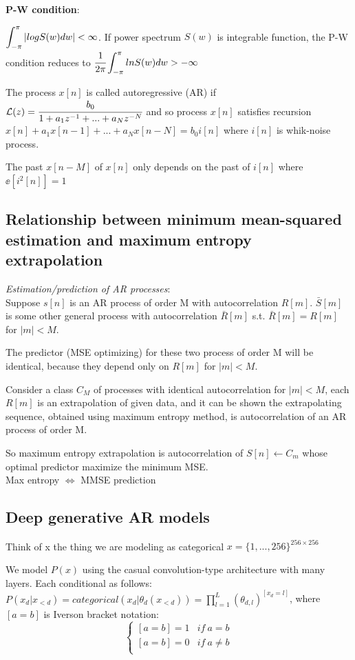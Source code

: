 \documentclass[12pt,a4paper]{article}
\begin{document}
\vspace{0.5cm}
\textbf{P-W condition}:

$\bint{-\pi}{\pi}|logS(w)dw|< \infty$. If power spectrum $S(w)$ is integrable function, the P-W condition reduces to $\cfrac{1}{2\pi}\bint{-\pi}{\pi} lnS(w)dw>-\infty$

The process $x[n]$ is called autoregressive (AR) if $\mathcal{L}(z)=\cfrac{b_0}{1+a_1z^{-1}+...+a_Nz^{-N}}$ and so process $x[n]$ satisfies recursion 
$x[n]+a_1x[n-1]+...+a_Nx[n-N]=b_0i[n]$ where $i[n]$ is whik-noise process. 

The past $x[n-M]$ of $x[n]$ only depends on the past of $i[n]$ where $\ee[i^2[n]]=1$

\subsection{Relationship between minimum mean-squared estimation and maximum entropy extrapolation}
\textit{Estimation/prediction of AR processes}: \\
Suppose $s[n]$ is an AR process of order M with autocorrelation $R[m]$. $\bar{S}[m]$ is some other general process with autocorrelation $\bar{R}[m]$ s.t. $\bar{R}[m]=R[m]$ for $|m|<M$. 

The predictor (MSE optimizing) for these two process of order M will be identical, because they depend only on $R[m]$ for $|m|<M$.

Consider a class $C_M$ of processes with identical autocorrelation for $|m|<M$, each $R[m]$ is an extrapolation of given data, and it can be shown the extrapolating sequence, obtained using maximum entropy method, is autocorrelation of an AR process of order M. 

So maximum entropy extrapolation is autocorrelation of $S[n]\leftarrow C_m$ whose optimal predictor maximize the minimum MSE. \\
Max entropy $\Leftrightarrow$ MMSE prediction

\subsection{Deep generative AR models}

Think of x the thing we are modeling as categorical $x=\{1, ..., 256\}^{256\times 256}$

We model $P(x)$ using the casual convolution-type architecture with many layers. Each conditional as follows:\\
$P(x_d|x_{<d})=categorical(x_d|\theta_d(x_{<d}))=\prod_{l=1}^L (\theta_{d,l})^{[x_d=l]}$, where $[a=b]$ is Iverson bracket notation:
\begin{equation*}
\begin{cases}
[a=b]=1 & if\ a=b\\
[a=b]=0 & if\ a\neq b\\
\end{cases}
\end{equation*}
\end{document}
